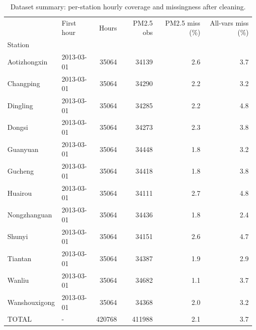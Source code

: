 \begin{table}
\caption{Dataset summary: per-station hourly coverage and missingness after cleaning.}
\label{tab:dataset}
\begin{tabular}{llrrrr}
\toprule
 & First hour & Hours & PM2.5 obs & PM2.5 miss (\%) & All-vars miss (\%) \\
Station &  &  &  &  &  \\
\midrule
Aotizhongxin & 2013-03-01 & 35064 & 34139 & 2.6 & 3.7 \\
Changping & 2013-03-01 & 35064 & 34290 & 2.2 & 3.2 \\
Dingling & 2013-03-01 & 35064 & 34285 & 2.2 & 4.8 \\
Dongsi & 2013-03-01 & 35064 & 34273 & 2.3 & 3.8 \\
Guanyuan & 2013-03-01 & 35064 & 34448 & 1.8 & 3.2 \\
Gucheng & 2013-03-01 & 35064 & 34418 & 1.8 & 3.8 \\
Huairou & 2013-03-01 & 35064 & 34111 & 2.7 & 4.8 \\
Nongzhanguan & 2013-03-01 & 35064 & 34436 & 1.8 & 2.4 \\
Shunyi & 2013-03-01 & 35064 & 34151 & 2.6 & 4.7 \\
Tiantan & 2013-03-01 & 35064 & 34387 & 1.9 & 2.9 \\
Wanliu & 2013-03-01 & 35064 & 34682 & 1.1 & 3.7 \\
Wanshouxigong & 2013-03-01 & 35064 & 34368 & 2.0 & 3.2 \\
TOTAL & - & 420768 & 411988 & 2.1 & 3.7 \\
\bottomrule
\end{tabular}
\end{table}
